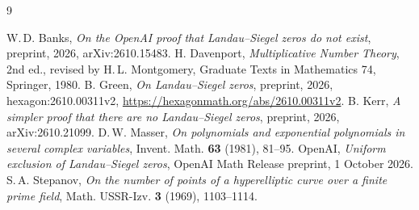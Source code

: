 \documentclass[11pt]{amsart}
\begin{document}
\begin{thebibliography}{9}\footnotesize\raggedright\setlength{\itemsep}{0pt}
 W.\,D. Banks, \emph{On the OpenAI proof that Landau--Siegel zeros do not exist},
preprint, 2026, arXiv:2610.15483.
 H. Davenport, \emph{Multiplicative Number Theory}, 2nd ed., revised by
H.\,L. Montgomery, Graduate Texts in Mathematics 74, Springer, 1980.
 B. Green, \emph{On Landau--Siegel zeros}, preprint, 2026, hexagon:2610.00311v2,
\url{https://hexagonmath.org/abs/2610.00311v2}.
 B. Kerr, \emph{A simpler proof that there are no Landau--Siegel zeros}, preprint,
2026, arXiv:2610.21099.
 D.\,W. Masser, \emph{On polynomials and exponential polynomials in several complex
variables}, Invent. Math. \textbf{63} (1981), 81--95.
 OpenAI, \emph{Uniform exclusion of Landau--Siegel zeros}, OpenAI Math Release
preprint, 1 October 2026.
 S.\,A. Stepanov, \emph{On the number of points of a hyperelliptic curve over a
finite prime field}, Math. USSR-Izv. \textbf{3} (1969), 1103--1114.
\end{thebibliography}
\end{document}
